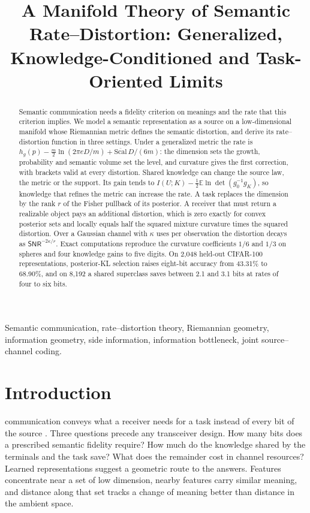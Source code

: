 \documentclass[10pt,journal]{IEEEtran}
\title{A Manifold Theory of Semantic Rate--Distortion: Generalized, Knowledge-Conditioned and Task-Oriented Limits}
\author{} %
\newcommand{\E}{\mathbb E}
\begin{document}
\maketitle
\begin{abstract}
Semantic communication needs a fidelity criterion on meanings and the rate that this criterion implies. We model a semantic representation as a source on a low-dimensional manifold whose Riemannian metric defines the semantic distortion, and derive its rate--distortion function in three settings. Under a generalized metric the rate is $h_g(p)-\frac m2\ln(2\pi eD/m)+\overline{\mathrm{Scal}}\,D/(6m)$: the dimension sets the growth, probability and semantic volume set the level, and curvature gives the first correction, with brackets valid at every distortion. Shared knowledge can change the source law, the metric or the support. Its gain tends to $I(U;K)-\frac12\E\ln\det(g_0^{-1}g_K)$, so knowledge that refines the metric can increase the rate. A task replaces the dimension by the rank $r$ of the Fisher pullback of its posterior. A receiver that must return a realizable object pays an additional distortion, which is zero exactly for convex posterior sets and locally equals half the squared mixture curvature times the squared distortion. Over a Gaussian channel with $\kappa$ uses per observation the distortion decays as $\mathsf{SNR}^{-2\kappa/r}$. Exact computations reproduce the curvature coefficients $1/6$ and $1/3$ on spheres and four knowledge gains to five digits. On 2,048 held-out CIFAR-100 representations, posterior-KL selection raises eight-bit accuracy from 43.31\% to 68.90\%, and on 8,192 a shared superclass saves between 2.1 and 3.1 bits at rates of four to six bits.
\end{abstract}
\begin{IEEEkeywords}
Semantic communication, rate--distortion theory, Riemannian geometry, information geometry, side information, information bottleneck, joint source--channel coding.
\end{IEEEkeywords}

\section{Introduction}
 communication conveys what a receiver needs for a task instead of every bit of the source \cite{gunduz2023beyond}. Three questions precede any transceiver design. How many bits does a prescribed semantic fidelity require? How much do the knowledge shared by the terminals and the task save? What does the remainder cost in channel resources? Learned representations suggest a geometric route to the answers. Features concentrate near a set of low dimension, nearby features carry similar meaning, and distance along that set tracks a change of meaning better than distance in the ambient space.
\end{document}
